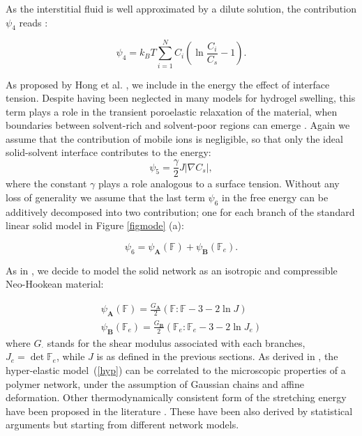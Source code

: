 \documentclass[runningheads]{llncs}
\newcommand{\F}{\ensuremath{\mathbb{F}}}
\begin{document}
As the interstitial fluid is well approximated by a dilute solution, the contribution $\psi_4$ reads \cite{Reviewpolyel,ecm1,ecm2}:

\begin{equation}
\psi_4 = k_B T \sum\limits_{i=1}^{N} C_i \left(\ln \frac{C_i}{ C_s}-1\right).
\end{equation}

As proposed by Hong et al. \cite{Interface}, we include in the energy the effect of interface tension. Despite having been neglected in many models for hydrogel swelling, this term plays a role in the transient poroelastic relaxation of the material, when boundaries between solvent-rich and solvent-poor regions can emerge \cite{sarah,Interface}. Again we assume that the contribution of mobile ions is negligible, so that only the ideal solid-solvent interface contributes to the energy:
\begin{equation}
\psi_5 = \frac{\gamma}{2} J \left|\nabla C_s\right|,
\end{equation}
where the constant $\gamma$ plays a role analogous to a surface tension. Without any loss of generality we assume that the last term $\psi_6$ in the free energy can be additively decomposed into two contribution; one for each branch of the standard linear solid model in Figure \ref{figmode} (a):

\begin{equation}
\psi_6 = \psi_\mathbf{A}(\F) + \psi_\mathbf{B}(\F_e).
\end{equation}

As in \cite{ecm2}, we decide to model the solid network as an isotropic and compressible Neo-Hookean material:

\begin{eqnarray}
\psi_\mathbf{A}(\F) = \frac{G_\mathbf{A}}{2} \left(\F:\F - 3 -2 \ln J\right)\\
\psi_\mathbf{B}(\F_e) = \frac{G_\mathbf{B}}{2} \left(\F_e:\F_e - 3 -2 \ln J_{e}\right)\label{hyp}
\end{eqnarray}
where $G_\mathbf{\cdot}$ stands for the shear modulus associated with each branches, $J_e= \det \F_e$, while $J$ is as defined in the previous sections. As derived in \cite{floryprinciples}, the hyper-elastic model~(\ref{hyp}) can be correlated to the microscopic properties of a polymer network, under the assumption of Gaussian chains and affine deformation. Other thermodynamically consistent form of the stretching energy have been proposed in the literature \cite{BERGSTROM1998931,boyce2,doi}. These have been also derived by statistical arguments but starting from different network models.

\newpage


%
\end{document}
